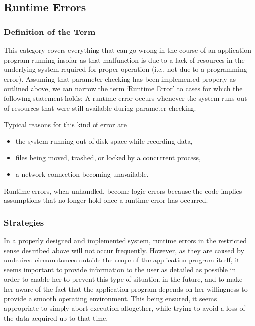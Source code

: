 \documentclass[12pt,letterpaper]{article}
\begin{document}
\subsection{Runtime Errors}

\subsubsection{Definition of the Term}

This category covers everything that can go wrong
in the course of an application program running
insofar as that malfunction is due to a lack of resources in the
underlying system required for proper operation
(i.e., not due to a programming error).
Assuming that parameter checking has been implemented
properly as outlined above, we can narrow the term
`Runtime Error' to cases for which the following statement
holds: A runtime error occurs whenever the system runs
out of resources that were still available during parameter
checking.

Typical reasons for this kind of error are
\begin{itemize}
\item the system running out of disk space while recording data,
\item files being moved, trashed, or locked by a concurrent process,
\item a network connection becoming unavailable.
\end{itemize}

Runtime errors, when unhandled, become logic errors because
the code implies assumptions that no longer hold once a
runtime error has occurred.

\subsubsection{Strategies}

In a properly designed and implemented system, runtime errors
in the restricted sense described above will not occur 
frequently. However, as they are caused by undesired
circumstances outside the scope of the application program
itself, it seems important to provide information
to the user as detailed as possible in order to enable her
to prevent this type of situation in the future, and to 
make her aware of the fact that the application program
depends on her willingness to provide a smooth operating
environment. This being ensured, it seems appropriate to
simply abort execution altogether, while trying to avoid 
a loss of the data acquired up to that time.
\end{document}
